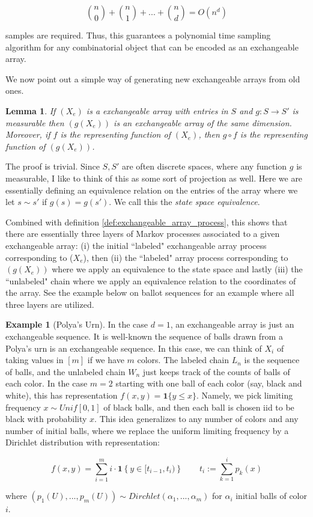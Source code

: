 \documentclass[11pt,oneside,reqno]{article}
\theoremstyle{plain}
\newtheorem{lemma}[theorem]{Lemma}
\theoremstyle{definition}
\newtheorem{example}[theorem]{Example}
\numberwithin{equation}{section}
\renewcommand{\leq}{\leqslant}
\newcommand{\ind}{\mathbf{1}}
\begin{document}
\[{n \choose 0} + {n \choose 1} + ... + {n \choose d} = O(n^d)\]

\noindent samples are required. Thus, this guarantees a polynomial time sampling algorithm for any combinatorial object that can be encoded as an exchangeable array. 

We now point out a simple way of generating new exchangeable arrays from old ones.

\begin{lemma}
    If $(X_e)$ is a exchangeable array with entries in $S$ and $g:S \to S'$ is measurable then $(g(X_e))$ is an exchangeable array of the same dimension. Moreover, if $f$ is the representing function of $(X_e)$, then $g \circ f$ is the representing function of $(g(X_e))$.

    \label{lem:state_equivalence}
\end{lemma}

\noindent The proof is trivial. Since $S,S'$ are often discrete spaces, where any function $g$ is measurable, I like to think of this as some sort of projection as well. Here we are essentially defining an equivalence relation on the entries of the array where we let $s \sim s'$ if $g(s) = g(s')$. We call this the \textit{state space equivalence}. 

Combined with definition \ref{def:exchangeable_array_process}, this shows that there are essentially three layers of Markov processes associated to a given exchangeable array: (i) the initial ``labeled" exchangeable array process corresponding to ($X_e$), then (ii) the ``labeled" array process corresponding to $(g(X_e))$ where we apply an equivalence to the state space and lastly (iii) the ``unlabeled" chain where we apply an equivalence relation to the coordinates of the array. See the example below on ballot sequences for an example where all three layers are utilized.


\begin{example}[Polya's Urn]
\label{ex:polyas_urn}
    In the case $d=1$, an exchangeable array is just an exchangeable sequence. It is well-known the sequence of balls drawn from a Polya's urn is an exchangeable sequence. In this case, we can think of $X_i$ of taking values in $[m]$ if we have $m$ colors. The labeled chain $L_n$ is the sequence of balls, and the unlabeled chain $W_n$ just keeps track of the counts of balls of each color. In the case $m=2$ starting with one ball of each color (say, black and white), this has representation $f(x,y) = \ind \{y \leq x\}$. Namely, we pick limiting frequency $x \sim Unif[0,1]$ of black balls, and then each ball is chosen iid to be black with probability $x$. This idea generalizes to any number of colors and any number of initial balls, where we replace the uniform limiting frequency by a Dirichlet distribution with representation:

    \[f(x,y) = \sum_{i=1}^m i \cdot \ind \left\{y \in [t_{i-1}, t_{i})\right\} \qquad t_i := \sum_{k=1}^i p_k(x)\]

    \noindent where $(p_1(U), ..., p_m(U)) \sim Dirchlet(\alpha_1,..., \alpha_m)$ for $\alpha_i$ initial balls of color $i$. 
\end{example}
\end{document}
